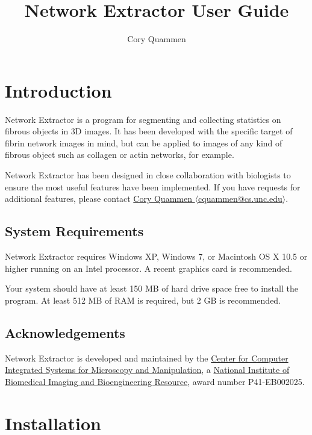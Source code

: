 \documentclass[11pt,titlepage,twoside]{article}
\title{Network Extractor \ProgramVersion User Guide}
\author{Cory Quammen}
\begin{document}
\maketitle
\tableofcontents
\vfill

\pagebreak

\section{Introduction}

Network Extractor \ProgramVersion is a program for segmenting and collecting statistics on fibrous objects in 3D images. It has been developed with the specific target of fibrin network images in mind, but can be applied to images of any kind of fibrous object such as collagen or actin networks, for example.

Network Extractor \ProgramVersion has been designed in close collaboration with biologists to ensure the most useful features have been implemented. If you have requests for additional features, please contact  \href{mailto:cquammen@cs.unc.edu}{Cory Quammen $\langle$cquammen@cs.unc.edu$\rangle$}.


\subsection{System Requirements}

Network Extractor \ProgramVersion requires Windows XP, Windows 7, or Macintosh OS X 10.5 or higher running on an Intel processor. A recent graphics card is recommended.

Your system should have at least 150 MB of hard drive space free to install the program. At least 512 MB of RAM is required, but 2 GB is recommended.

\subsection{Acknowledgements}

Network Extractor \ProgramVersion is developed and maintained by the \href{http://www.cismm.org}{Center for Computer Integrated Systems for Microscopy and Manipulation}, a \href{http://www.nibib.nih.gov/}{National Institute of Biomedical Imaging and Bioengineering Resource}, award number P41-EB002025.

\section{Installation}
\end{document}
